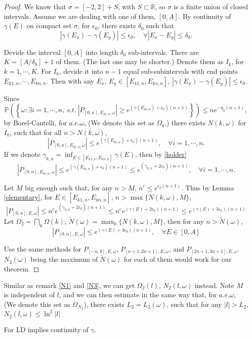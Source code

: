 \begin{proof}
We know that $\sigma=[-2,2]+S$, with $S\subset\mathbb{R}$, so $\sigma$ is a finite union of closed intervals. Assume we are dealing with one of them, $[0,A]$. By continuity of $\gamma(E)$ on compact set $\sigma$, for $\epsilon_0$, there exists $\delta_0$ such that
\begin{equation}\label{holder}
|\gamma(E_x)-\gamma(E_y)|\leq \epsilon_0,\quad \forall |E_x-E_y|\leq \delta_0.
\end{equation}

Devide the interval $[0,A]$ into length $\delta_0$ sub-intervals. There are $K=[A/\delta_0]+1$ of them. (The last one may be shorter.) Denote them as $I_k$, for $k=1,\cdots, K$. For $I_k$, devide it into $n-1$ equal sub-subintervals with end points $E_{k1,n},\cdots,E_{kn,n}$. Then with any $E_x$, $E_y\in [E_{k1,n},E_{kn,n}]$, $|\gamma(E_x)-\gamma(E_y)|\leq \epsilon_0$.

Since
\[
\mathbb{P}\left(\left\{\omega:  \exists i=1,\cdots,n,~s.t.~|P_{[0,n],E_{ki,n},\omega}|\geq e^{(\gamma(E_{ki,n})+\epsilon_0)(n+1)} \right\}\right)\leq ne^{-\eta_0(n+1)},
\]
by Borel-Cantelli, for $a.e.\omega$, (We denote this set as $\Omega_{k}$,) there exists $N(k, \omega)$ for $I_k$, such that for all $n>N(k,\omega)$,
\[
|P_{[0,n],E_{ki,n},\omega}|\leq e^{(\gamma(E_{ki,n})+\epsilon_0)(n+1)},\quad \forall i=1,\cdots,n.
\]
If we denote $\gamma_{k,n}=\inf_{E\in [E_{k1,n},E_{kn,n}]}{\gamma(E)}$, then by \eqref{holder}
\[
|P_{[0,n],E_{ki,n},\omega}|\leq e^{(\gamma(E_{ki,n})+\epsilon_0)(n+1)}\leq e^{(\gamma_{k,n}+2\epsilon_0)(n+1)}, \quad \forall i=1,\cdots,n.
\]

Let $M$ big enough such that, for any $n>M$, $n^c\leq e^{\epsilon_0(n+1)}$. Thus by Lemma \ref{elementary}, for $E\in[E_{k1,n},E_{kn,n}]$, $n>\max\{N(k,\omega),M\}$,
\[
|P_{[0,n],E,\omega}|\leq n^ce^{(\gamma_{k,n}+2\epsilon_0)(n+1)}\leq n^ce^{(\gamma(E)+2\epsilon_0)(n+1)}\leq e^{(\gamma(E)+3\epsilon_0)(n+1)}
\]
Let $\Omega_2=\bigcap\limits_k \Omega(k)$,  $\tilde{N}(\omega)=\max_k\{N(k,\omega),M\}$, then for any $n>\tilde{N}(\omega)$,
\[
|P_{[0,n],E,\omega}|\leq e^{(\gamma(E)+3\epsilon_0)(n+1)},\quad \forall E\in [0,A]
\]

Use the same methods for $P_{[-n,0],E,\omega}$, $P_{[n+1,2n+1],E,\omega}$, and $P_{[2n+1,3n+1],E,\omega}$. $N_2(\omega)$ being the maximum of $\tilde{N}(\omega)$ for each of them would work for our theorem.
\end{proof}
\begin{remark}\label{N2}
  Similar as remark \ref{N1} and \ref{N3}, we can get $\Omega_2(l)$, $N_2(l,\omega)$ instead. Note $M$ is independent of $l$, and we can then estimate in the same way that, for $a.e.\omega$, (We denote this set as $\Omega_{N_2}$), there exists $L_2=L_2(\omega)$, such that for any $|l|>L_2$, $N_2(l,\omega)\leq \ln^2 |l|$
\end{remark}
\begin{remark}
  For LD implies continuity of $\gamma$.
\end{remark}
